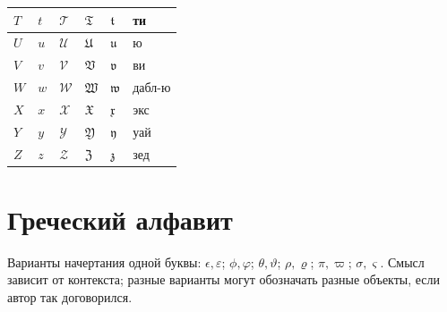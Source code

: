 \begin{longtable}{|p{.09\linewidth}|p{.09\linewidth}|p{.18\linewidth}|p{.18\linewidth}|p{.18\linewidth}|p{.17\linewidth}|}
\(T\)&\(t\)&\(\mathcal{T}\)&\(\mathfrak{T}\)&\(\mathfrak{t}\)&ти\\\hline
\(U\)&\(u\)&\(\mathcal{U}\)&\(\mathfrak{U}\)&\(\mathfrak{u}\)&ю\\\hline
\(V\)&\(v\)&\(\mathcal{V}\)&\(\mathfrak{V}\)&\(\mathfrak{v}\)&ви\\\hline
\(W\)&\(w\)&\(\mathcal{W}\)&\(\mathfrak{W}\)&\(\mathfrak{w}\)&дабл-ю\\\hline
\(X\)&\(x\)&\(\mathcal{X}\)&\(\mathfrak{X}\)&\(\mathfrak{x}\)&экс\\\hline
\(Y\)&\(y\)&\(\mathcal{Y}\)&\(\mathfrak{Y}\)&\(\mathfrak{y}\)&уай\\\hline
\(Z\)&\(z\)&\(\mathcal{Z}\)&\(\mathfrak{Z}\)&\(\mathfrak{z}\)&зед\\\hline
\end{longtable}
\endgroup

\clearpage\section*{Греческий алфавит}

Варианты начертания одной буквы: \(\epsilon,\varepsilon\); \(\phi,\varphi\); \(\theta,\vartheta\); \(\rho,\varrho\); \(\pi,\varpi\); \(\sigma,\varsigma\). Смысл зависит от контекста; разные варианты могут обозначать разные объекты, если автор так договорился.

